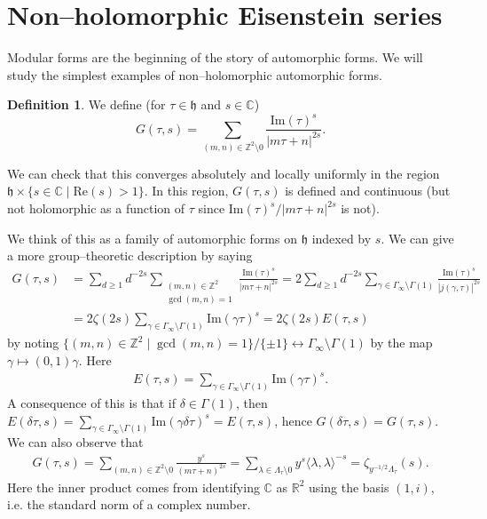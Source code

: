 \documentclass{article}
\theoremstyle{definition}
\newtheorem{defn}{Definition}[section]
\begin{document}
\section{Non--holomorphic Eisenstein series}
Modular forms are the beginning of the story of automorphic forms. We will study the simplest examples of non--holomorphic automorphic forms.
\begin{defn}
    We define (for $\tau \in \mathfrak{h}$ and $s \in \mathbb{C}$)
    $$G(\tau,s) = \sum_{(m,n) \in \mathbb{Z}^2 \setminus 0}^{} \frac{\text{Im}(\tau)^s}{|m \tau + n|^{2s}}.$$
\end{defn}
We can check that this converges absolutely and locally uniformly in the region $\mathfrak{h} \times \{s \in \mathbb{C} \mid \text{Re}(s)>1\}$. In this region, $G(\tau,s)$ is defined and continuous (but not holomorphic as a function of $\tau$ since $\text{Im}(\tau)^s/|m \tau + n|^{2s}$ is not).
\vspace{1mm}
 
We think of this as a family of automorphic forms on $\mathfrak{h}$ indexed by $s$. We can give a more group--theoretic description by saying 
\begin{align*}
    G(\tau,s) &= \sum_{d\ge 1}^{} d^{-2s} \sum_{\substack{(m,n) \in \mathbb{Z}^2\\ \gcd(m,n) = 1}}^{} \frac{\text{Im}(\tau)^s}{|m \tau + n|^{2s}} = 2 \sum_{d\ge 1}^{} d^{-2s} \sum_{\gamma \in \Gamma_{\infty} \setminus  \Gamma(1)} \frac{\text{Im}(\tau)^s}{|j(\gamma,\tau)|^{2s}} \\
    &= 2\zeta(2s)\sum_{\gamma \in \Gamma_{\infty} \setminus  \Gamma(1)}\text{Im}(\gamma \tau)^s = 2\zeta(2s)E(\tau,s)
\end{align*}
by noting $\{(m,n) \in \mathbb{Z}^2 \mid \gcd(m,n) = 1\}/\{\pm 1\} \leftrightarrow \Gamma_{\infty} \setminus \Gamma(1)$ by the map $\gamma \mapsto (0,1)\gamma$. Here
\begin{align*}
    E(\tau, s) = \sum_{\gamma \in \Gamma_{\infty} \setminus  \Gamma(1)}^{} \text{Im}(\gamma \tau)^{s}.
\end{align*}
A consequence of this is that if $\delta \in \Gamma(1)$, then $E(\delta \tau, s) = \sum_{\gamma \in \Gamma_{\infty}\setminus \Gamma(1)} \text{Im}(\gamma \delta \tau)^s = E(\tau, s)$, hence $G(\delta \tau, s) = G(\tau, s)$. We can also observe that 
\begin{align*}
    G(\tau, s) = \sum_{(m,n) \in \mathbb{Z}^2 \setminus 0}^{} \frac{y^s}{(m \tau +n)^{2s}} = \sum_{\lambda \in \Lambda_\tau\setminus 0}^{} y^s  \langle \lambda, \lambda \rangle^{-s} = \zeta_{y^{-1/2}\Lambda_{\tau}}(s).
\end{align*}
Here the inner product comes from identifying $\mathbb{C}$ as $\mathbb{R}^2$ using the basis $(1,i)$, i.e. the standard norm of a complex number.
\end{document}
